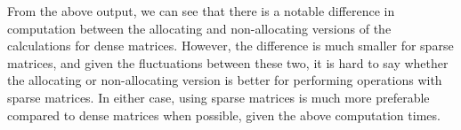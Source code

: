 \documentclass{article}
\begin{document}
From the above output, we can see that there is a notable difference in computation between the allocating and non-allocating versions of the calculations for dense matrices. However, the difference is much smaller for sparse matrices, and given the fluctuations between these two, it is hard to say whether the allocating or non-allocating version is better for performing operations with sparse matrices. In either case, using sparse matrices is much more preferable compared to dense matrices when possible, given the above computation times.
\end{document}
